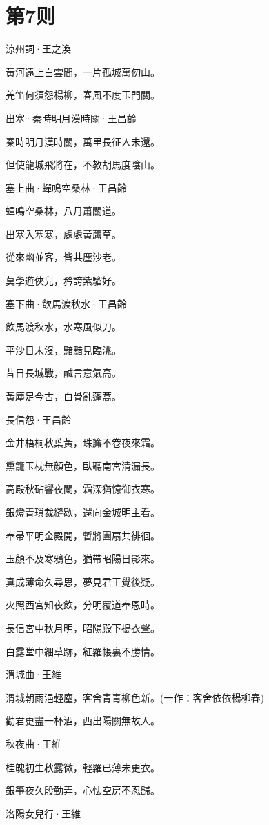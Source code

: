 \documentclass[12pt,a4paper]{ctexbook}
\begin{document}
\section{第7则}
涼州詞·王之渙\par
黃河遠上白雲間，一片孤城萬仞山。\par
羌笛何須怨楊柳，春風不度玉門關。\par
出塞·秦時明月漢時關·王昌齡\par
秦時明月漢時關，萬里長征人未還。\par
但使龍城飛將在，不教胡馬度陰山。\par
塞上曲·蟬鳴空桑林·王昌齡\par
蟬鳴空桑林，八月蕭關道。\par
出塞入塞寒，處處黃蘆草。\par
從來幽並客，皆共塵沙老。\par
莫學遊俠兒，矜誇紫騮好。\par
塞下曲·飲馬渡秋水·王昌齡\par
飲馬渡秋水，水寒風似刀。\par
平沙日未沒，黯黯見臨洮。\par
昔日長城戰，鹹言意氣高。\par
黃塵足今古，白骨亂蓬蒿。\par
長信怨·王昌齡\par
金井梧桐秋葉黃，珠簾不卷夜來霜。\par
熏籠玉枕無顏色，臥聽南宮清漏長。\par
高殿秋砧響夜闌，霜深猶憶御衣寒。\par
銀燈青瑣裁縫歇，還向金城明主看。\par
奉帚平明金殿開，暫將團扇共徘徊。\par
玉顏不及寒鴉色，猶帶昭陽日影來。\par
真成薄命久尋思，夢見君王覺後疑。\par
火照西宮知夜飲，分明覆道奉恩時。\par
長信宮中秋月明，昭陽殿下搗衣聲。\par
白露堂中細草跡，紅羅帳裏不勝情。\par
渭城曲·王維\par
渭城朝雨浥輕塵，客舍青青柳色新。(一作：客舍依依楊柳春)\par
勸君更盡一杯酒，西出陽關無故人。\par
秋夜曲·王維\par
桂魄初生秋露微，輕羅已薄未更衣。\par
銀箏夜久殷勤弄，心怯空房不忍歸。\par
洛陽女兒行·王維\par
\end{document}
